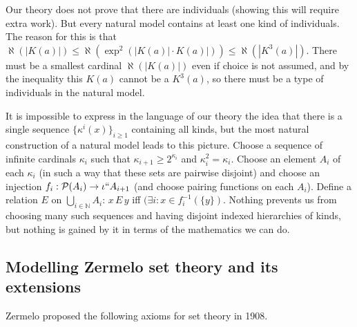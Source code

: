 \documentclass[12pt]{article}
\begin{document}
Our theory does not prove that there are individuals (showing this will require extra work).  But every natural model contains at least one kind of individuals.  The reason for this is that $\aleph(|K(a)|) \leq \aleph(\exp^2(|K(a)|\cdot K(a)|)) \leq \aleph(|K^3(a)|)$.  There must be a smallest cardinal $\aleph(|K(a)|)$ even if choice is not assumed, and by the inequality
this $K(a)$ cannot be a $K^3(a)$, so there must be a type of individuals in the natural model.

It is impossible to express in the language of our theory the idea that there is a single sequence $\{\kappa^i(x)\}_{i \geq 1}$ containing all kinds, but the most natural construction of a natural model leads to this picture.  Choose a sequence of infinite cardinals $\kappa_i$ such that $\kappa_{i+1} \geq 2^{\kappa_i}$ and $\kappa_i^2=\kappa_i$.  Choose an element $A_i$ of each $\kappa_i$ (in such a way that these sets are pairwise disjoint) and choose an injection $f_i:{\cal P}(A_i) \rightarrow \iota``A_{i+1}$ (and choose pairing functions on each $A_i$).  Define a relation $E$ on $\bigcup_{i \in \mathbb N}A_i$:  $x \,E\,y$ iff $(\exists i:x \in f_{i}^{-1}(\{y\})$.   Nothing prevents us from choosing many such sequences and having disjoint indexed hierarchies of kinds, but nothing is gained by it in terms of the mathematics we can do.

\subsection{Modelling Zermelo set theory and its extensions}

Zermelo proposed the following axioms for set theory in 1908.
\end{document}
